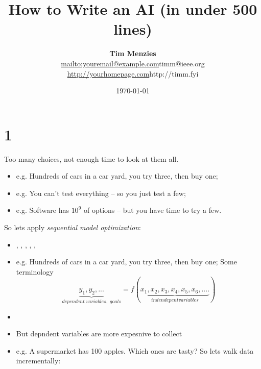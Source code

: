 \documentclass[twocolumn,landscape]{book}
\title{How to  Write an AI (in under 500 lines)}
\author{{\bf Tim Menzies}\\ \url{mailto:youremail@example.com}{timm@ieee.org} \\ \url{http://yourhomepage.com}{http://timm.fyi}}
\date{\today}
\begin{document}
\maketitle

\chapter{1}
Too many choices, not enough time to look at them all.
\begin{itemize}
\item e.g. Hundreds of cars in a car yard, you try three, then buy one;
\item e.g. You can't test everything -- so you just test a few;
\item e.g. Software has $10^9$ of options -- but you  have time to try a few.
\end{itemize}
So lets apply {\em sequential model optimization}:
\begin{itemize}
\item \citet{xia2020sequential}, 
\citet{hutter2011sequential},
\citet{nair2018finding},
\citet{hsu2018arrow},
\citet{mockus1989bayesian},
\citet{golovin17}



\item e.g. Hundreds of cars in a car yard, you try three, then buy one;
Some terminology
\[ \underbrace{y_1,y_2,...}_{\mathit{}dependent\;variables,\;goals} = f(\underbrace{x_1, x_2, x_3, x_4, x_5, x_6,....}_{\mathit{indendepent variables}})
\]
\end{itemize}
\begin{itemize}
\item 
\item But depndent variables are more expesnive to collect 
\item e.g. A supermarket has 100 apples. Which ones are tasty?
So lets walk data incrementally:
\end{itemize}
\end{document}
